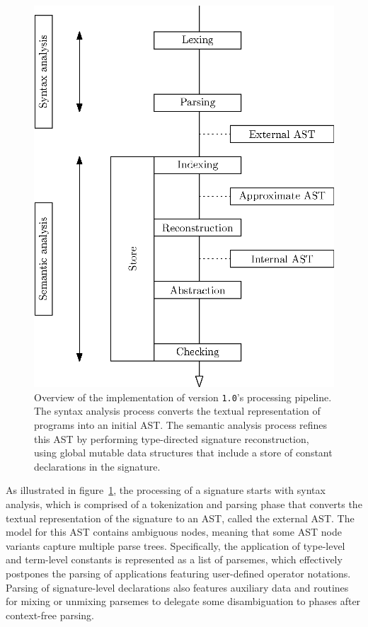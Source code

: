 \begin{figure}
\centering
\includegraphics{figures/legacy-beluga-processing-pipeline.eps}
\caption[Overview of \Beluga version \texttt{1.0}'s processing pipeline]{%
Overview of the implementation of \Beluga version \texttt{1.0}'s processing pipeline.
The syntax analysis process converts the textual representation of \Beluga programs into an initial \acs{AST}.
The semantic analysis process refines this \acs{AST} by performing type-directed signature reconstruction, using global mutable data structures that include a store of constant declarations in the signature.
}
\label{figure:legacy-beluga-processing-pipeline}
\end{figure}

As illustrated in figure~\ref{figure:legacy-beluga-processing-pipeline}, the processing of a \Beluga signature starts with syntax analysis, which is comprised of a tokenization and parsing phase that converts the textual representation of the signature to an \ac{AST}, called the external \ac{AST}.
The model for this \ac{AST} contains ambiguous nodes, meaning that some \ac{AST} node variants capture multiple parse trees.
Specifically, the application of \LF type-level and term-level constants is represented as a list of parsemes, which effectively postpones the parsing of applications featuring user-defined operator notations.
Parsing of signature-level declarations also features auxiliary data and routines for mixing or unmixing parsemes to delegate some disambiguation to phases after context-free parsing.

